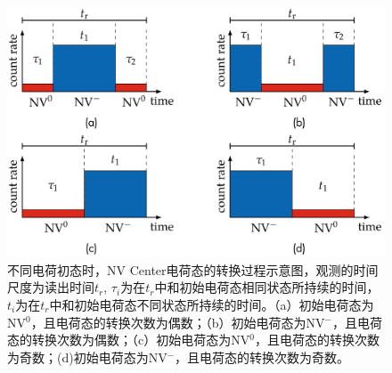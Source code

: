 \documentclass[type = bachelor]{whu-thesis}
\begin{document}
\begin{figure}
  \centering
  \includegraphics[width=1.0\textwidth]{figures/Chapter 3/Charge Conversion.png}
  \caption[不同电荷初态时，NV Center电荷态的转换过程示意图]{不同电荷初态时，NV Center电荷态的转换过程示意图，观测的时间尺度为读出时间$t_r$, $\tau_i$为在$t_r$中和初始电荷态相同状态所持续的时间，$t_i$为在$t_r$中和初始电荷态不同状态所持续的时间。（a）初始电荷态为NV$^0$，且电荷态的转换次数为偶数；（b）初始电荷态为NV$^-$，且电荷态的转换次数为偶数；（c）初始电荷态为NV$^0$，且电荷态的转换次数为奇数；(d)初始电荷态为NV$^-$，且电荷态的转换次数为奇数。}
  \label{fig: Charge Conversion}
\end{figure}
\end{document}

